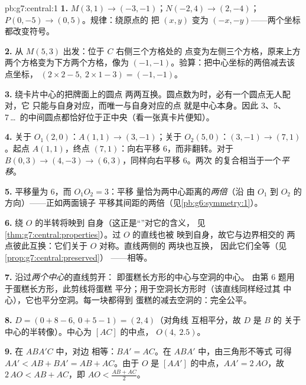 \begin{solution}{pb:g7:central:1}
\textbf{1.} $M(3, 1) \to (-3, -1)$；$N(-2, 4) \to (2, -4)$；
$P(0, -5) \to (0, 5)$。规律：绕原点的
把 $(x, y)$ 变为 $(-x, -y)$——两个坐标都改变符号。

\textbf{2.} 从 $M(5, 3)$ 出发：位于 $C$ 右侧三个方格处的
点变为左侧三个方格，原来上方两个方格变为下方两个方格，像为
$(-1, -1)$。验算：把中心坐标的两倍减去该点坐标，
$(2 \times 2 - 5,\ 2 \times 1 - 3) = (-1, -1)$。

\textbf{3.} 绕卡片中心的把牌面上的圆点
两两互换。圆点数为时，必有一个圆点无人配对，它
只能与自身对应，而唯一与自身对应的点
就是中心本身。因此 3、5、
7\,\dots\ 的中间圆点都恰好位于正中央（看一张真卡片便知）。

\textbf{4.} 关于 $O_1(2,0)$：$A(1,1) \to (3,-1)$；关于
$O_2(5,0)$：$(3,-1) \to (7,1)$。起点 $A(1,1)$，终点
$(7,1)$：向右平移 $6$，而非翻转。对于
$B(0,3) \to (4,-3) \to (6,3)$，同样向右平移 $6$。两次
的复合相当于一个\emph{平移}。

\textbf{5.} 平移量为 $6$，而 $O_1 O_2 = 3$：平移
量恰为两中心距离的\emph{两倍}（沿
由 $O_1$ 到 $O_2$ 的方向）——正如两面镜子
平移其间距的两倍（见\cref{pb:g6:symmetry:1}）。

\textbf{6.} 绕 $O$ 的半转将映到
自身（这正是“”对它的含义，
见\cref{thm:g7:central:properties}）。过 $O$ 的直线也被
映到自身，故它与边界相交的
两点彼此互换：它们关于 $O$ 对称。直线两侧的
两块也互换，
因此它们全等（见\cref{prop:g7:central:preserved}）
——相等。

\textbf{7.} 沿过\emph{两个中心}的直线剪开：
即蛋糕长方形的中心与空洞的中心。
由第 6 题用于蛋糕长方形，此剪线将蛋糕
平分；用于空洞长方形时（该直线同样经过其
中心），它也平分空洞。每一块都得到
蛋糕的减去空洞的：完全公平。

\textbf{8.} $D = (0 + 8 - 6,\ 0 + 5 - 1) = (2, 4)$（对角线
互相平分，故 $D$ 是 $B$ 的
关于中心的半转像）。中心为 $[AC]$ 的中点，
$O(4,\ 2.5)$。

\textbf{9.} 在 $ABA'C$ 中，对边
相等：$BA' = AC$。在 $ABA'$ 中，由三角形不等式
可得 $AA' < AB + BA' = AB + AC$。由于 $O$ 是
$[AA']$ 的中点，$AA' = 2\,AO$，故 $2\,AO < AB + AC$，即
$AO < \frac{AB + AC}{2}$。


\end{solution}
